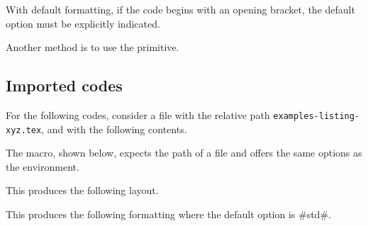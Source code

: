 

\begin{tdocwarn}
    With default formatting, if the code begins with an opening bracket, the default option must be explicitly indicated.


    \smallskip

    Another method is to use the  primitive.

\end{tdocwarn}


\subsection{Imported codes}

For the following codes, consider a file with the relative path \verb+examples-listing-xyz.tex+, and with the following contents.



\medskip

The  macro, shown below, expects the path of a file and offers the same options as the  environment.




\begin{tdocexa}
    \leavevmode

    \begin{tdoclatex}[code]

    \end{tdoclatex}

    This produces the following layout.


\end{tdocexa}




\begin{tdocexa}[Following]
    \leavevmode

    \begin{tdoclatex}[code]

    \end{tdoclatex}

    This produces the following formatting where the default option is \tdocinlatex#std#.


\end{tdocexa}



